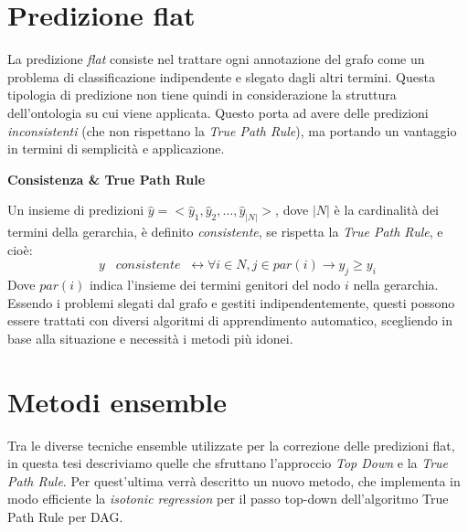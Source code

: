 \documentclass[12pt]{report}
\begin{document}
\section{Predizione flat}
La predizione \textit{flat} consiste nel trattare ogni annotazione del grafo come un problema di classificazione indipendente e slegato dagli altri termini. Questa tipologia di predizione non tiene quindi in considerazione la struttura dell'ontologia su cui viene applicata. 
\newline
\newline
Questo porta ad avere delle predizioni \emph{inconsistenti} (che non rispettano la \emph{True Path Rule}), ma portando un vantaggio in termini di semplicità e applicazione.
\newline
\newline
\newpage

\textbf{Consistenza \& True Path Rule}

Un insieme di predizioni $\hat{y} = <\hat{y}_1, \hat{y}_2, \dots, \hat{y}_{|N|}>$, dove $|N|$ è la cardinalità dei termini della gerarchia, è definito \emph{consistente}, se rispetta la \emph{True Path Rule}, e cioè:
\[
y\;\;\;consistente\;\; \leftrightarrow \forall i \in N, j \in par(i) \rightarrow y_j \geq y_i
\] 
Dove $par(i)$ indica l'insieme dei termini genitori del nodo $i$ nella gerarchia.
\newline
\newline
Essendo i problemi slegati dal grafo e gestiti indipendentemente, questi possono essere trattati con diversi algoritmi di apprendimento automatico, scegliendo in base alla situazione e necessità i metodi più idonei.

\section{Metodi ensemble}
Tra le diverse tecniche ensemble utilizzate per la correzione delle predizioni flat, in questa tesi descriviamo quelle che sfruttano l'approccio \emph{Top Down} e la \emph{True Path Rule}. Per quest'ultima verrà descritto un nuovo metodo, che implementa in modo efficiente la \emph{isotonic regression} per il passo top-down dell'algoritmo True Path Rule per DAG.
\end{document}
